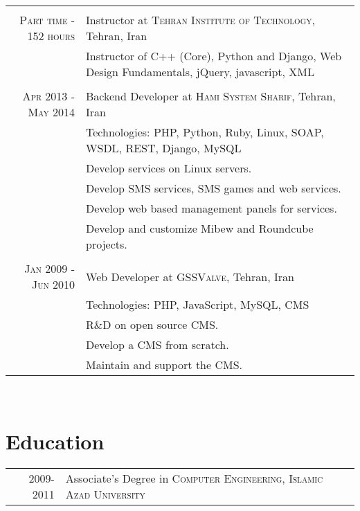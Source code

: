 \documentclass[a4paper,11pt]{article}
\begin{document}
\begin{tabular}{r|p{11cm}}
    \multicolumn{2}{c}{}\\
    \textsc{Part time - 152 hours}
    & Instructor at \textsc{Tehran Institute of Technology},
    Tehran, Iran\\
    &\footnotesize{Instructor of C++ (Core), Python and Django, Web Design Fundamentals, jQuery, javascript, XML}\\

    \multicolumn{2}{c}{}\\
    \textsc{Apr 2013 - May 2014}
    & Backend Developer at \textsc{Hami System Sharif},
    Tehran, Iran\\
    &\footnotesize{Technologies: PHP, Python, Ruby, Linux, SOAP, WSDL, REST, Django, MySQL}\\
    &\footnotesize{Develop services on Linux servers.}\\
    &\footnotesize{Develop SMS services, SMS games and web services.}\\
    &\footnotesize{Develop web based management panels for services.}\\
    &\footnotesize{Develop and customize Mibew and Roundcube projects.}\\

    \multicolumn{2}{c}{}\\
    \textsc{Jan 2009 - Jun 2010}
    & Web Developer at \textsc{GSSValve},
    Tehran, Iran\\
    &\footnotesize{Technologies: PHP, JavaScript, MySQL, CMS}\\
    &\footnotesize{R\&D on open source CMS.}\\
    &\footnotesize{Develop a CMS from scratch.}\\
    &\footnotesize{Maintain and support the CMS.}

\end{tabular}\\

\section{Education}
\begin{tabular}{rp{12cm}}

    \textsc{} 2009-2011 & Associate’s Degree in \textsc{Computer Engineering},
    \textsc{Islamic Azad University}\\

\end{tabular}\\

\end{document}
